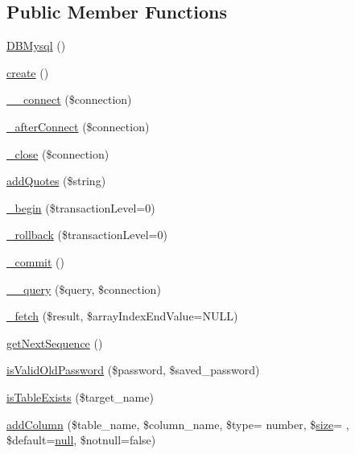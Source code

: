 \subsection*{Public Member Functions}
\begin{DoxyCompactItemize}
\item 
\hyperlink{classDBMysql_a74c9966448ca4a373407ce6f3a1d7eb0}{D\+B\+Mysql} ()
\item 
\hyperlink{classDBMysql_a58ab5c56561966d486ba54129aed954d}{create} ()
\item 
\hyperlink{classDBMysql_ad11061c47d57c2f346947e0789ecb46b}{\+\_\+\+\_\+connect} (\$connection)
\item 
\hyperlink{classDBMysql_a660e94bc5cde26859bb95cc428ca92da}{\+\_\+after\+Connect} (\$connection)
\item 
\hyperlink{classDBMysql_a59581237e4dcb5f91f63de2459248e13}{\+\_\+close} (\$connection)
\item 
\hyperlink{classDBMysql_a9674193c36272fa9ea16c20d91cfbfe5}{add\+Quotes} (\$string)
\item 
\hyperlink{classDBMysql_a60dec65d2138fed25d0331e498972df8}{\+\_\+begin} (\$transaction\+Level=0)
\item 
\hyperlink{classDBMysql_af146dafdfc0dd7ce0f04427ac371a1ea}{\+\_\+rollback} (\$transaction\+Level=0)
\item 
\hyperlink{classDBMysql_a3f720677af37c36b2bc2934dd358a477}{\+\_\+commit} ()
\item 
\hyperlink{classDBMysql_aa33da673a8c415b641b4e0b5209d3453}{\+\_\+\+\_\+query} (\$query, \$connection)
\item 
\hyperlink{classDBMysql_a4c7d83d8dcbb8e65c8fdfe75fa7d9fa5}{\+\_\+fetch} (\$result, \$array\+Index\+End\+Value=N\+U\+LL)
\item 
\hyperlink{classDBMysql_a926ea6ca10e71ae128be90604b78411f}{get\+Next\+Sequence} ()
\item 
\hyperlink{classDBMysql_a19020f1ece293bcc332400234ee95dea}{is\+Valid\+Old\+Password} (\$password, \$saved\+\_\+password)
\item 
\hyperlink{classDBMysql_a095f2a64a070958c18cb3ebfab3043e5}{is\+Table\+Exists} (\$target\+\_\+name)
\item 
\hyperlink{classDBMysql_ab9f9ee7573485e7767c1dd7dd54cead0}{add\+Column} (\$table\+\_\+name, \$column\+\_\+name, \$type= \textquotesingle{}number\textquotesingle{}, \$\hyperlink{jquery-1_8x_8js_afa6806c6ee5e63d5177f1dcc082ba6bc}{size}= \textquotesingle{}\textquotesingle{}, \$default=\hyperlink{modernizr_8min_8js_a286f9ec831c5e676eeb493248eab9575}{null}, \$notnull=false)

\end{DoxyCompactItemize}
